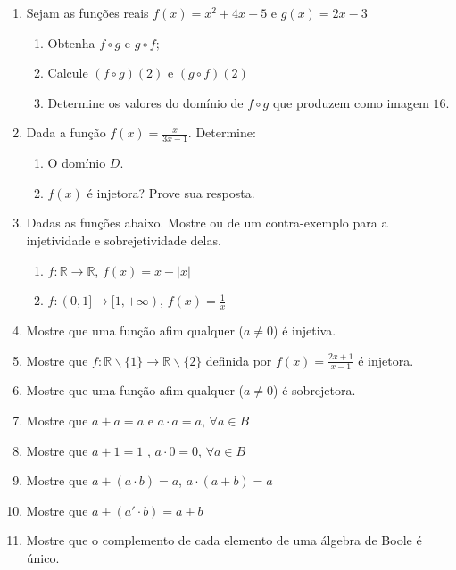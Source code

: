 \documentclass[oneside,a4paper,12pt]{article}
\begin{document}
\begin{enumerate}
	\item Sejam as funções reais $f(x) = x^2 + 4x - 5$ e $g(x) = 2x -3$
	\begin{enumerate}
	\item Obtenha $f \circ g$ e $g \circ f$;
	\item Calcule $(f \circ g)(2)$ e $(g \circ f)(2)$
	\item Determine os valores do domínio de $f \circ g$ que produzem como imagem $16$.
	\end{enumerate}

	\item Dada a função $f(x) = \frac{x}{3x-1}$. Determine:
	\begin{enumerate}
		\item O domínio $D$.
		\item $f(x)$ é injetora? Prove sua resposta.
	\end{enumerate}

	\item Dadas as funções abaixo. Mostre ou de um contra-exemplo para a injetividade e sobrejetividade delas.
	\begin{enumerate}
		\item $f: \mathbb{R} \rightarrow \mathbb{R}$, $f(x) = x- |x|$
		\item $f:(0,1] \rightarrow [1,+\infty)$, $f(x) = \frac{1}{x}$
	\end{enumerate}

	\item Mostre que uma função afim qualquer ($a \neq 0$) é injetiva.

	\item Mostre que $f:\mathbb{R}\backslash\{1\} \rightarrow \mathbb{R}\backslash\{2\}$ definida por $f(x) = \frac{2x+1}{x-1}$ é injetora.

	\item Mostre que uma função afim qualquer ($a \neq 0$) é sobrejetora.
	
	\item Mostre que $a + a = a$ e $a \cdot a = a$, $\forall a \in B$
	
	\item Mostre que $a + 1 = 1$ , $a \cdot 0 = 0$, $\forall a \in B$
	
	\item Mostre que $a + (a \cdot b) = a$, $a \cdot (a + b) = a$
	
	\item Mostre que $a + (a' \cdot b) = a + b$
	
	\item Mostre que o complemento de cada elemento de uma álgebra de Boole é único.
	

\end{enumerate}
\end{document}

